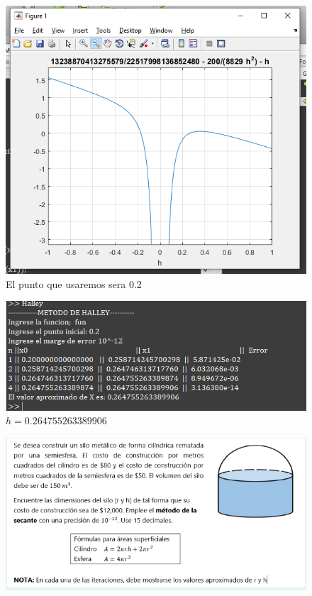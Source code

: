 \documentclass{article}
\theoremstyle{mytheoremstyle}
\theoremstyle{mytheoremstyle}
\theoremstyle{myproblemstyle}
\begin{document}
\begin{figure}[ht]
    \includegraphics[scale=0.6]{img/eje3_4.png}{\\El punto que usaremos sera 0.2}
\end{figure}

\begin{figure}[ht]
    \includegraphics[scale=0.7]{img/eje3_5.png}{\\$h=0.264755263389906$}
\end{figure}


\pagebreak
\begin{figure}[ht]
    \includegraphics[scale=0.8]{img/eje4_1.png} 
\end{figure}
\end{document}
